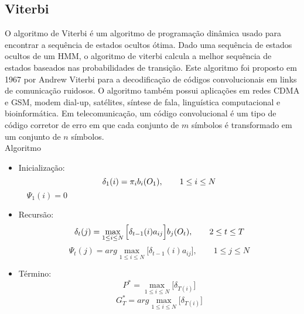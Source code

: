 \subsection{Viterbi}
\label{secViterbi}
O algoritmo de Viterbi é um algoritmo de programação dinâmica usado para encontrar a sequência de estados ocultos ótima. Dado uma sequência de estados ocultos de um HMM, o algoritmo de viterbi calcula a melhor sequência de estados baseados nas probabilidades de transição. Este algoritmo foi proposto em 1967 por Andrew Viterbi para a decodificação de códigos convolucionais em links de comunicação ruidosos.  O algoritmo também possui aplicações  em redes CDMA e GSM, modem dial-up, satélites, síntese de fala, linguística computacional e bioinformática. Em telecomunicação, um código convolucional é um tipo de código corretor de erro em que cada conjunto de $m$ símbolos é transformado em um conjunto de $n$ símbolos.\\
Algoritmo
\begin{itemize}
\item Inicialização:\\
\begin{equation}
\delta_1 (i) = \pi_i b_i (O_1), \qquad 1 \leq i \leq N \\
\end{equation}
$
\quad \Psi_1 (i) = 0
$

\item Recursão:\\
\begin{equation}
\displaystyle \delta_t (j) = \max\limits_{1 \leq i \leq N} \Big[\delta_{t-1}(i) a_{ij} \Big]b_j (O_t), \qquad 2 \leq t \leq T\\
\end{equation}
\begin{equation}
\displaystyle \Psi_t (j) = arg\max\limits_{1 \leq i \leq N}\Big[\delta_{t-1} (i)a_{ij}\Big], \qquad 1\leq j \leq N
\end{equation}

\item Término:\\
\begin{equation}
\displaystyle P^* =\max\limits_{1 \leq i \leq N}  \Big[\delta_{T(i)}\Big] 
\end{equation}
\begin{equation}
\displaystyle G^*_T = arg\max\limits_{1 \leq i \leq N}  \Big[\delta_{T(i)}\Big]
\end{equation}


\end{itemize}

